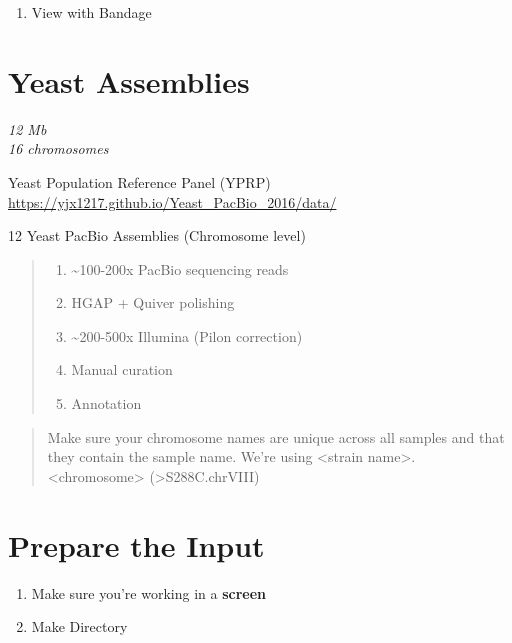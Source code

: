 \documentclass[
]{book}
\providecommand{\tightlist}{%
  \setlength{\itemsep}{0pt}\setlength{\parskip}{0pt}}
\begin{document}
\begin{enumerate}
\def\labelenumi{\arabic{enumi}.}
\setcounter{enumi}{2}
\tightlist
\item
  View with Bandage
\end{enumerate}

\hypertarget{yeast-assemblies}{%
\section{Yeast Assemblies}\label{yeast-assemblies}}

\emph{12 Mb}\\
\emph{16 chromosomes}

Yeast Population Reference Panel (YPRP) \url{https://yjx1217.github.io/Yeast_PacBio_2016/data/}

12 Yeast PacBio Assemblies (Chromosome level)

\begin{quote}
\begin{enumerate}
\def\labelenumi{\arabic{enumi}.}
\tightlist
\item
  \textasciitilde100-200x PacBio sequencing reads
\item
  HGAP + Quiver polishing\\
\item
  \textasciitilde200-500x Illumina (Pilon correction)\\
\item
  Manual curation\\
\item
  Annotation
\end{enumerate}
\end{quote}

\begin{quote}
Make sure your chromosome names are unique across all samples and that they contain the sample name. We're using \textless strain name\textgreater.\textless chromosome\textgreater{} (\textgreater S288C.chrVIII)
\end{quote}

\hypertarget{prepare-the-input}{%
\section{Prepare the Input}\label{prepare-the-input}}

\begin{enumerate}
\def\labelenumi{\arabic{enumi}.}
\item
  Make sure you're working in a \textbf{screen}
\item
  Make Directory
\end{enumerate}
\end{document}
